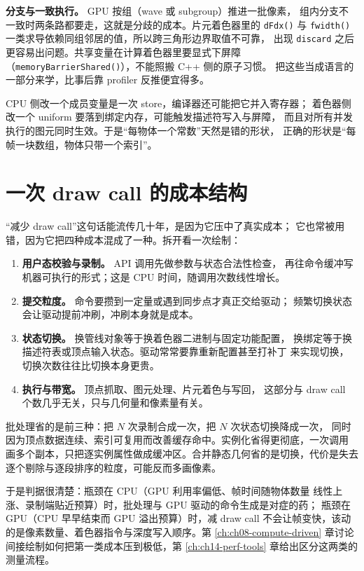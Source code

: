 \documentclass[12pt,a4paper,fontset=fandol]{ctexbook}
\newcommand{\Fn}[1]{\texttt{#1()}}
\newcommand{\Tp}[1]{\texttt{#1}}
\newcommand{\Lang}[1]{\textsf{#1}}
\newcommand{\CPP}{\Lang{C++}}
\newcommand{\DomCPU}{\Lang{CPU}}
\newcommand{\DomGPU}{\Lang{GPU}}
\begin{document}
\textbf{分支与一致执行。} \DomGPU{} 按组（wave 或 subgroup）推进一批像素，
组内分支不一致时两条路都要走，这就是分歧的成本。片元着色器里的 \Fn{dFdx}
与 \Fn{fwidth} 一类求导依赖同组邻居的值，所以跨三角形边界取值不可靠，
出现 \Tp{discard} 之后更容易出问题。共享变量在计算着色器里要显式下屏障
（\Fn{memoryBarrierShared}），不能照搬 \CPP{} 侧的原子习惯。
把这些当成语言的一部分来学，比事后靠 profiler 反推便宜得多。

\begin{compare}[title={同一次改一个数在两侧的代价}]
\DomCPU{} 侧改一个成员变量是一次 store，编译器还可能把它并入寄存器；
着色器侧改一个 uniform 要落到绑定内存，可能触发描述符写入与屏障，
而且对所有并发执行的图元同时生效。于是``每物体一个常数''天然是错的形状，
正确的形状是``每帧一块数组，物体只带一个索引''。\end{compare}

\section{一次 draw call 的成本结构}

``减少 draw call''这句话能流传几十年，是因为它压中了真实成本；
它也常被用错，因为它把四种成本混成了一种。拆开看一次绘制：

\begin{enumerate}
  \item \textbf{用户态校验与录制。} API 调用先做参数与状态合法性检查，
        再往命令缓冲写机器可执行的形式；这是 \DomCPU{} 时间，随调用次数线性增长。
  \item \textbf{提交粒度。} 命令要攒到一定量或遇到同步点才真正交给驱动；
        频繁切换状态会让驱动提前冲刷，冲刷本身就是成本。
  \item \textbf{状态切换。} 换管线对象等于换着色器二进制与固定功能配置，
        换绑定等于换描述符表或顶点输入状态。驱动常常要靠重新配置甚至打补丁
        来实现切换，切换次数往往比切换本身更贵。
  \item \textbf{执行与带宽。} 顶点抓取、图元处理、片元着色与写回，
        这部分与 draw call 个数几乎无关，只与几何量和像素量有关。
\end{enumerate}

批处理省的是前三种：把 $N$ 次录制合成一次，把 $N$ 次状态切换降成一次，
同时因为顶点数据连续、索引可复用而改善缓存命中。实例化省得更彻底，一次调用
画多个副本，只把逐实例属性做成缓冲区。合并静态几何省的是切换，代价是失去
逐个剔除与逐段排序的粒度，可能反而多画像素。

于是判据很清楚：瓶颈在 \DomCPU{}（\DomGPU{} 利用率偏低、帧时间随物体数量
线性上涨、录制端贴近预算）时，批处理与 \DomGPU{} 驱动的命令生成是对症的药；
瓶颈在 \DomGPU{}（\DomCPU{} 早早结束而 \DomGPU{} 溢出预算）时，减 draw call
不会让帧变快，该动的是像素数量、着色器指令与深度写入顺序。第
\ref{ch:ch08-compute-driven} 章讨论间接绘制如何把第一类成本压到极低，第
\ref{ch:ch14-perf-tools} 章给出区分这两类的测量流程。
\end{document}
